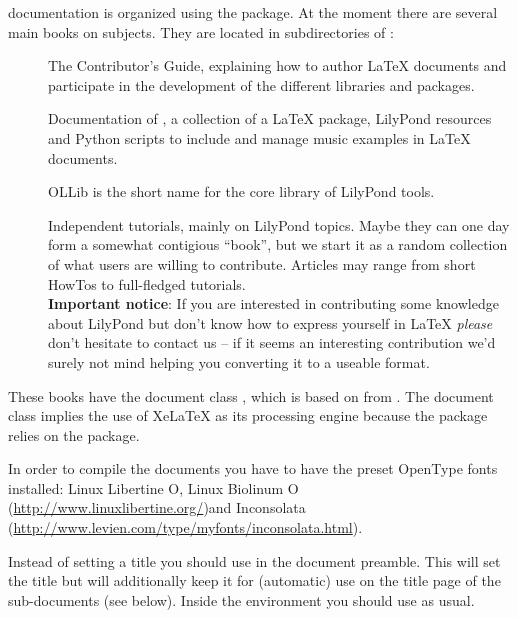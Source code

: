 \documentclass[openlilylib-cg]{subfiles}
\begin{document}
\openlilylib{} documentation is organized using the  package.
At the moment there are several main books on \openlilylib{} subjects.
They are located in subdirectories of :
\begin{description}
\item[] The Contributor's Guide, explaining how to author \LaTeX{} documents and participate in the development of the different libraries and packages.
\item[] Documentation of , a collection of a \LaTeX{} package, LilyPond resources and Python scripts to include and manage music examples in \LaTeX{} documents.
\item[] OLLib is the short name for the core \openlilylib{} library of LilyPond tools.
\item[] Independent tutorials, mainly on LilyPond topics.
Maybe they can one day form a somewhat contigious “book”, but we start it as a random collection of what users are willing to contribute.
Articles may range from short HowTos to full-fledged tutorials.\\
\textsf{\textbf{Important notice}}: If you are interested in contributing some knowledge about LilyPond but don't know how to express yourself in \LaTeX{} \emph{please} don't hesitate to contact us -- if it seems an interesting contribution we'd surely not mind helping you converting it to a useable format.
\end{description}

These books have the document class , which is based on  from .
The document class implies the use of XeLaTeX as its processing engine because the  package relies on the  package.

In order to compile the documents you have to have the preset OpenType fonts installed: Linux Libertine O, Linux Biolinum O (\url{http://www.linuxlibertine.org/})and Inconsolata (\url{http://www.levien.com/type/myfonts/inconsolata.html}).

Instead of setting a title you should use  in the document preamble.
This will set the title but will additionally keep it for (automatic) use on the title page of the sub-documents (see below).
Inside the  environment you should use  as usual.
\end{document}

